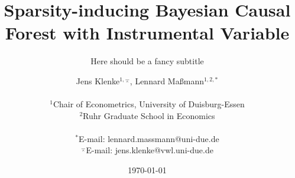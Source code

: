 \documentclass[oneside, english, reqno, 11pt, headsepline, BCOR=8.5mm]{scrbook} %
\title{Sparsity-inducing Bayesian Causal Forest with Instrumental Variable}
\subtitle{Here should be a fancy subtitle}
\author
{Jens Klenke$^{1,\barwedge}$, Lennard Ma{\ss}mann$^{1,2,\ast}$ \\
\\
\normalsize{$^{1}$Chair of Econometrics, University of Duisburg-Essen}\\
\normalsize{$^{2}$Ruhr Graduate School in Economics}\\
\\
\normalsize{$^\ast$E-mail:  lennard.massmann@uni-due.de}\\
\normalsize{$^\barwedge$E-mail:  jens.klenke@vwl.uni-due.de}\\
}
\date{\today}
\numberwithin{equation}{section}
\numberwithin{figure}{section}
\theoremstyle{Theorem}
\theoremstyle{Definition}
\newcommand\summaryname{Abstract}
\newenvironment{Abstract}%
    {\small\begin{center}%
    \bfseries{\summaryname} \end{center}}
\begin{document}
\frontmatter
%
\maketitle


\cleardoublepage


\begin{Abstract}
\begin{changemargin}{1cm}{1cm}
Your text:\lipsum[10]
\end{changemargin}
\end{Abstract}

\cleardoublepage


\end{document}
